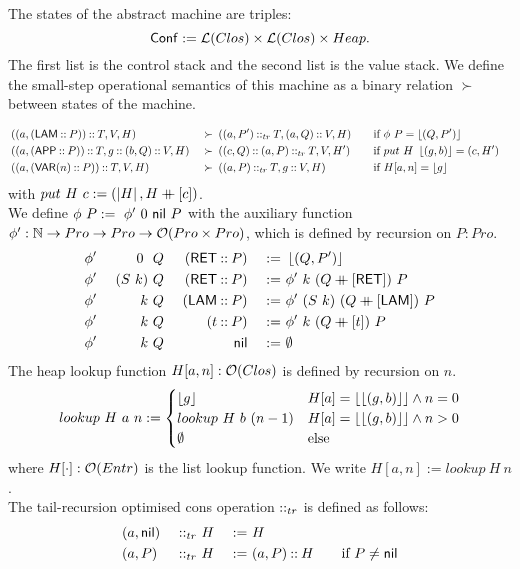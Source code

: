 The states of the abstract machine are triples:
\[
  \mathsf{Conf} := \mathcal{L}(Clos) \times \mathcal{L}(Clos) \times Heap.
\]
The first list is the control stack and the second list is the value stack.  We define the small-step operational semantics of this machine as a
binary relation $\succ$ between states of the machine.
\begin{definition}
  {\small
    \begin{alignat*}{4}
      & \left((a, (\mathsf{LAM} \mathbin{::} P)) \mathbin{::} T, V, H\right)                      &~\succ~& \left((a, P') \mathbin{::}_{tr} T, (a,Q) \mathbin{::} V, H\right)
      \quad&& \text{if $\phi~P = \left\lfloor {(Q, P')} \right\rfloor$} & \\
      & \left((a, (\mathsf{APP} \mathbin{::} P)) \mathbin{::} T, g \mathbin{::} (b, Q) \mathbin{::} V, H\right) &~\succ~& \left((c, Q) \mathbin{::} (a,P) \mathbin{::}_{tr} T, V, H'\right)
      \quad&& \text{if $put~H~\left\lfloor {(g,b)} \right\rfloor = (c,H')$} \\
      & \left((a, (\mathsf{VAR}(n) \mathbin{::} P)) \mathbin{::} T, V, H\right)                   &~\succ~& \left((a, P) \mathbin{::}_{tr} T, g \mathbin{::} V, H\right)
      \quad&& \text{if $H[a,n]=\left\lfloor {g} \right\rfloor$} &
    \end{alignat*}
  }
  with $put~H~c := (\left| H \right|, H \mathbin{+\mkern-10mu+} [c]) $.\\
  We define $\phi~P :=~ \phi'~0~\mathsf{nil}~P$ with the auxiliary function $\phi' : \mathbb{N} \rightarrow Pro \rightarrow Pro \rightarrow \mathcal{O}(Pro \times Pro)$, which is defined by
  recursion on $P:Pro$.
  \begin{alignat*}{4}
    &\phi'&~0~   &~Q&~(\mathsf{RET} \mathbin{::} P) &&~:=~& \left\lfloor {(Q,P')} \right\rfloor \\
    &\phi'&~(S~k)&~Q&~(\mathsf{RET} \mathbin{::} P) &&~:=~& \phi'~k~(Q \mathbin{+\mkern-10mu+} [\mathsf{RET}])~P \\
    &\phi'&~k    &~Q&~(\mathsf{LAM} \mathbin{::} P) &&~:=~& \phi'~(S~k)~(Q \mathbin{+\mkern-10mu+} [\mathsf{LAM}])~P \\
    &\phi'&~k    &~Q&~(t        \mathbin{::} P) &&~:=~& \phi'~k~(Q \mathbin{+\mkern-10mu+} [t])~P \\
    &\phi'&~k    &~Q&~              \mathsf{nil} &&~:=~& \emptyset \\
  \end{alignat*}
  The heap lookup function $H[a,n] : \mathcal{O}(Clos)$ is defined by recursion on $n$.
  \[
    lookup~H~a~n :=
    \begin{cases}
      \left\lfloor {g} \right\rfloor & H[a]=\left\lfloor {\left\lfloor {(g,b)} \right\rfloor} \right\rfloor \land n=0 \\
      lookup~H~b~(n-1) & H[a]=\left\lfloor {\left\lfloor {(g,b)} \right\rfloor} \right\rfloor \land n>0 \\
      \emptyset & \text{else}
    \end{cases}
  \]
  where $H[\cdot] : \mathcal{O}(Entr)$ is the list lookup function.  We write $H[a,n] := lookup~H~n$. \\
  The tail-recursion optimised cons operation $\mathbin{::}_{tr}$ is defined as follows:
  \begin{alignat*}{3}
    & (a, \mathsf{nil}) &~\mathbin{::}_{tr}~& H &~:=~& H \\
    & (a, P   ) &~\mathbin{::}_{tr}~& H &~:=~& (a, P) \mathbin{::} H \qquad\text{if $P \neq \mathsf{nil}$}
  \end{alignat*}
\end{definition}

